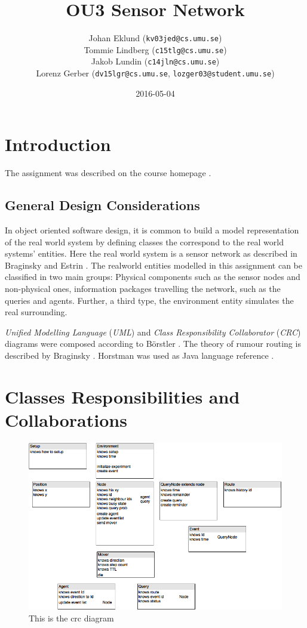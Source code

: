 \documentclass[a4paper,11pt,twoside]{article}
\title{OU3 Sensor Network}
\author{Johan Eklund ({\tt{kv03jed@cs.umu.se}}) \\ 
Tommie Lindberg ({\tt{c15tlg@cs.umu.se}}) \\
Jakob Lundin ({\tt{c14jln@cs.umu.se}}) \\
Lorenz Gerber ({\tt{dv15lgr@cs.umu.se}}, {\tt{lozger03@student.umu.se}})
}
\date{2016-05-04}
\begin{document}
\lstset{language=C}
\maketitle
\thispagestyle{empty}
\newpage
\tableofcontents
\thispagestyle{empty}
\newpage

\clearpage
{}

\section{Introduction} 
The assignment was described on the course homepage
\cite{sensornetwork}. 

\subsection{General Design Considerations}
In object oriented software design, it is common to build 
a model representation of the real world system \cite{roleplay} by
defining classes the correspond to the real world systems' entities.  
Here the real world system is a sensor network as described in
Braginsky and Estrin \cite{braginsky2002}. The realworld entities
modelled in this assignment can be classified in two main groups: Physical
components such as the sensor nodes and non-physical ones, information packages
travelling the network, such as the queries and agents. Further, a third type, 
the environment entity simulates the real surrounding.



\textit{Unified Modelling Language}
(\textit{UML}) and \textit{Class Responsibility Collaborator}
(\textit{CRC}) diagrams were composed according to Börstler
\cite{roleplay}. The theory of rumour routing is described by Braginsky
\cite{braginsky2002}. Horstman was used as Java language reference
\cite{horstman2014}.


\section{Classes Responsibilities and Collaborations}

\begin{figure}
\centering
\includegraphics[width=\textwidth]{crc.png}
\caption{This is the crc diagram}
\label{fig:crc}
\end{figure}
\end{document}
